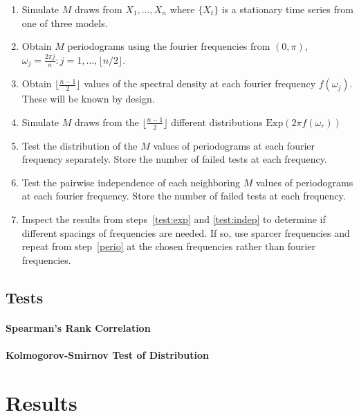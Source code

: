 \documentclass{article}\usepackage[]{graphicx}\usepackage[]{color}
\theoremstyle{plain}
\begin{document}
\begin{enumerate}
\item Simulate $M$ draws from $X_1,\dots, X_n$ where $\{X_t\}$ is a stationary time series from one of three models.
\item \label{perio}Obtain $M$ periodograms using the fourier frequencies from $(0, \pi)$, $\omega_j = \frac{2\pi j}{n}: j = 1, \dots, \lfloor n/2 \rfloor$.
\item Obtain $\lfloor\frac{n-1}{2}\rfloor$ values of the spectral density at each fourier frequency $f(\omega_j)$. These will be known by design.
\item Simulate $M$ draws from the $\lfloor\frac{n-1}{2}\rfloor$ different distributions $\text{Exp}(2\pi f(\omega_r))$
\item \label{test:exp}Test the distribution of the $M$ values of periodograms at each fourier frequency separately. Store the number of failed tests at each frequency.
\item \label{test:indep}Test the pairwise independence of each neighboring $M$ values of periodograms at each fourier frequency. Store the number of failed tests at each frequency.
\item Inspect the results from steps~\ref{test:exp} and \ref{test:indep} to determine if different spacings of frequencies are needed. If so, use sparcer frequencies and repeat from step~\ref{perio} at the chosen frequencies rather than fourier frequencies.
\end{enumerate}


\subsection{Tests}



\paragraph{Spearman's Rank Correlation}



\paragraph{Kolmogorov-Smirnov Test of Distribution}






\section{Results}
\end{document}

